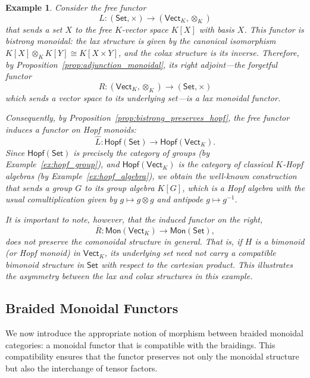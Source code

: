 \documentclass{amsart}
\newcommand{\Set}{\mathsf{Set}}
\newcommand{\Vect}{\mathsf{Vect}}
\newcommand{\VectK}{\Vect_K}
\newtheorem{example}{Example}[section]
\begin{document}
\begin{example}\label{ex:free_forgetful}
Consider the free functor
\[
L \colon (\Set, \times) \longrightarrow (\VectK, \otimes_K)
\]
that sends a set $X$ to the free $K$-vector space $K[X]$ with basis $X$. This functor is bistrong monoidal: the lax structure is given by the canonical isomorphism $K[X] \otimes_K K[Y] \cong K[X \times Y]$, and the colax structure is its inverse. Therefore, by Proposition~\ref{prop:adjunction_monoidal}, its right adjoint—the forgetful functor
\[
R \colon (\VectK, \otimes_K) \longrightarrow (\Set, \times)
\]
which sends a vector space to its underlying set—is a lax monoidal functor.

Consequently, by Proposition~\ref{prop:bistrong_preserves_hopf}, the free functor induces a functor on Hopf monoids:
\[
\widehat{L} \colon \mathsf{Hopf}(\Set) \longrightarrow \mathsf{Hopf}(\VectK).
\]
Since $\mathsf{Hopf}(\Set)$ is precisely the category of groups (by Example~\ref{ex:hopf_group}), and $\mathsf{Hopf}(\VectK)$ is the category of classical $K$-Hopf algebras (by Example~\ref{ex:hopf_algebra}), we obtain the well-known construction that sends a group $G$ to its group algebra $K[G]$, which is a Hopf algebra with the usual comultiplication given by $g \mapsto g \otimes g$ and antipode $g \mapsto g^{-1}$.

It is important to note, however, that the induced functor on the right,
\[
\overline{R} \colon \mathsf{Mon}(\VectK) \longrightarrow \mathsf{Mon}(\Set),
\]
does not preserve the comonoidal structure in general. That is, if $H$ is a bimonoid (or Hopf monoid) in $\VectK$, its underlying set need not carry a compatible bimonoid structure in $\Set$ with respect to the cartesian product. This illustrates the asymmetry between the lax and colax structures in this example.
\end{example}

\subsection{Braided Monoidal Functors}

We now introduce the appropriate notion of morphism between braided monoidal categories: a monoidal functor that is compatible with the braidings. This compatibility ensures that the functor preserves not only the monoidal structure but also the interchange of tensor factors.
\end{document}
